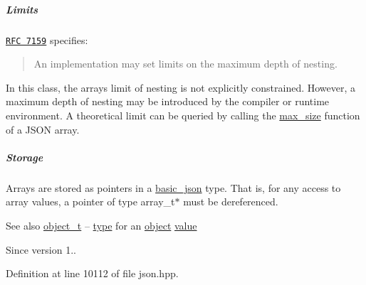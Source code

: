 \subparagraph*{Limits}

\href{http://rfc7159.net/rfc7159}{\tt R\+FC 7159} specifies\+: \begin{quote}
An implementation may set limits on the maximum depth of nesting. \end{quote}


In this class, the array\textquotesingle{}s limit of nesting is not explicitly constrained. However, a maximum depth of nesting may be introduced by the compiler or runtime environment. A theoretical limit can be queried by calling the \hyperlink{classnlohmann_1_1basic__json_a2f47d3c6a441c57dd2be00449fbb88e1}{max\+\_\+size} function of a J\+S\+ON array.

\subparagraph*{Storage}

Arrays are stored as pointers in a \hyperlink{classnlohmann_1_1basic__json}{basic\+\_\+json} type. That is, for any access to array values, a pointer of type {\ttfamily array\+\_\+t$\ast$} must be dereferenced.

\begin{DoxySeeAlso}{See also}
\hyperlink{classnlohmann_1_1basic__json_a5e48a7893520e1314bf0c9723e26ea2a}{object\+\_\+t} -- \hyperlink{classnlohmann_1_1basic__json_a2b2d781d7f2a4ee41bc0016e931cadf7}{type} for an \hyperlink{classnlohmann_1_1basic__json_aa13f7c0615867542ce80337cbcf13ada}{object} \hyperlink{classnlohmann_1_1basic__json_adcf8ca5079f5db993820bf50036bf45d}{value}
\end{DoxySeeAlso}
\begin{DoxySince}{Since}
version 1.. 
\end{DoxySince}


Definition at line 10112 of file json.\+hpp.

\mbox{\label{classnlohmann_1_1basic__json_afc4033f5af721feb287b0676723a145f}} 
